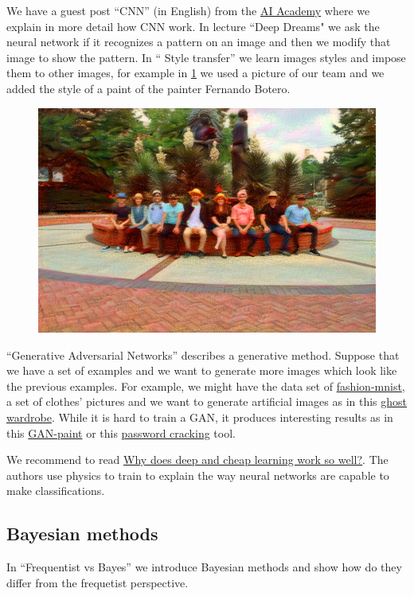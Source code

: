 \documentclass[11pt,letterpaper]{report}
\begin{document}
    We have a guest post ``CNN'' (in English) from the \href{https://aiacademy.tw}{AI Academy}\cite{wai} where
	 we explain in more detail how CNN work. In lecture ``Deep Dreams" we ask the neural network if it recognizes a pattern on an image and then we modify that image to show the pattern. In `` Style transfer'' we learn images styles and impose them to other images, for example  in \ref{fig:botero} we used a picture of our team and we added the style of a paint of the painter Fernando Botero. %
	
	
	\begin{figure}[h!]
		\centering
		\includegraphics[width=0.45\linewidth]{figures/botero.png}
		\caption{}
		\label{fig:botero}
	\end{figure} 	
	
	
	``Generative Adversarial Networks'' describes a generative method. Suppose that we have a set of examples and we want to generate more images which look like the previous examples. For example, we might have the data set of
	\href{https://github.com/zalandoresearch/fashion-mnist}{fashion-mnist}\cite{wfashion}, a set of  clothes' pictures and we want to generate artificial images as in this \href{https://github.com/spaceLenny/FashionDCGANExample}{ghost wardrobe}\cite{wghost}. While it is hard to train a GAN, it produces interesting results as in this \href{ https://twitter.com/henddkn/status/1067431379804262400?s=19 } {GAN-paint}\cite{wtwitter} or this 
	\href{    https://towardsdatascience.com/password-cracker-generating-passwords-with-recurrent-neural-networks-lstms-9583714a3310 
	}{password cracking}\cite{wpassword} tool.
	
	
	We recommend to read 	\href{    https://arxiv.org/abs/1608.08225 
	}{Why does deep and cheap learning work so well?}\cite{Lin2017}.  The authors use physics to train to explain the way neural networks are capable to make classifications. 
\subsection{Bayesian methods}
In ``Frequentist vs Bayes''
 we introduce Bayesian methods and show how do they differ from the frequetist perspective. 
 
\end{document}
